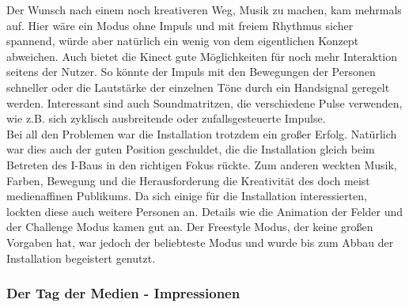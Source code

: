 Der Wunsch nach einem noch kreativeren Weg, Musik zu machen, kam mehrmals auf. Hier wäre ein Modus ohne Impuls und mit freiem Rhythmus sicher spannend, würde aber natürlich ein wenig von dem eigentlichen Konzept abweichen. Auch bietet die Kinect gute Möglichkeiten für noch mehr Interaktion seitens der Nutzer. So könnte der Impuls mit den Bewegungen der Personen schneller oder die Lautstärke der einzelnen Töne durch ein Handsignal geregelt werden. Interessant sind auch Soundmatritzen, die verschiedene Pulse verwenden, wie z.B. sich zyklisch ausbreitende oder zufallsgesteuerte Impulse.\\
Bei all den Problemen war die Installation trotzdem ein großer Erfolg. Natürlich war dies auch der guten Position geschuldet, die die Installation gleich beim Betreten des I-Baus in den richtigen Fokus rückte. Zum anderen weckten Musik, Farben, Bewegung und die Herausforderung die Kreativität des doch meist medienaffinen Publikums. Da sich einige für die Installation interessierten, lockten diese auch weitere Personen an. Details wie die Animation der Felder und der Challenge Modus kamen gut an. Der Freestyle Modus, der keine großen Vorgaben hat, war jedoch der beliebteste Modus und wurde bis zum Abbau der Installation begeistert genutzt.

\subsubsection{Der Tag der Medien - Impressionen}